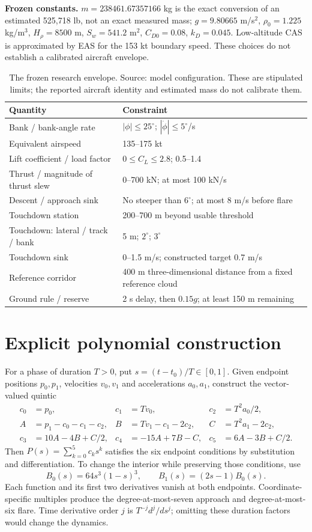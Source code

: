 \textbf{Frozen constants.} $m=238461.67357166$ kg is the exact conversion of an estimated 525,718 lb, not an exact measured mass; $g=9.80665$ m/s$^2$, $\rho_0=1.225$ kg/m$^3$, $H_\rho=8500$ m, $S_w=541.2$ m$^2$, $C_{D0}=0.08$, $k_D=0.045$. Low-altitude CAS is approximated by EAS for the 153 kt boundary speed. These choices do not establish a calibrated aircraft envelope.
\par\medskip
\begin{table}[htbp]\centering\small
\caption{The frozen research envelope. Source: model configuration. These are stipulated limits; the reported aircraft identity and estimated mass do not calibrate them.}
\begin{tabularx}{\textwidth}{@{}p{}X@{}}\toprule
Quantity & Constraint\\\midrule
Bank / bank-angle rate & $|\phi|\leq25^\circ$; $|\dot\phi|\leq5^\circ$/s\\
Equivalent airspeed & 135--175 kt\\
Lift coefficient / load factor & $0\leq C_L\leq2.8$; 0.5--1.4\\
Thrust / magnitude of thrust slew & 0--700 kN; at most 100 kN/s\\
Descent / approach sink & No steeper than $6^\circ$; at most 8 m/s before flare\\
Touchdown station & 200--700 m beyond usable threshold\\
Touchdown: lateral / track / bank & 5 m; $2^\circ$; $3^\circ$\\
Touchdown sink & 0--1.5 m/s; constructed target 0.7 m/s\\
Reference corridor & 400 m three-dimensional distance from a fixed reference cloud\\
Ground rule / reserve & 2 s delay, then $0.15g$; at least 150 m remaining\\\bottomrule
\end{tabularx}\end{table}

\section{Explicit polynomial construction}\label{app:polynomial}
For a phase of duration $T>0$, put $s=(t-t_0)/T\in[0,1]$. Given endpoint positions $p_0,p_1$, velocities $v_0,v_1$ and accelerations $a_0,a_1$, construct the vector-valued quintic
\begin{align}
c_0&=p_0,&c_1&=Tv_0,&c_2&=T^2a_0/2,\\
A&=p_1-c_0-c_1-c_2,&B&=Tv_1-c_1-2c_2,&C&=T^2a_1-2c_2,\\
c_3&=10A-4B+C/2,&c_4&=-15A+7B-C,&c_5&=6A-3B+C/2.
\end{align}
Then $P(s)=\sum_{k=0}^{5}c_ks^k$ satisfies the six endpoint conditions by substitution and differentiation. To change the interior while preserving those conditions, use
\[
B_0(s)=64s^3(1-s)^3,\qquad B_1(s)=(2s-1)B_0(s).
\]
Each function and its first two derivatives vanish at both endpoints. Coordinate-specific multiples produce the degree-at-most-seven approach and degree-at-most-six flare. Time derivative order $j$ is $T^{-j}d^j/ds^j$; omitting these duration factors would change the dynamics.

